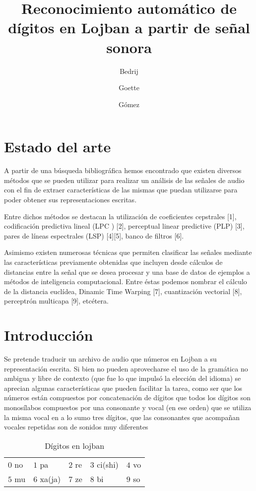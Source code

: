 \documentclass[a4paper]{article}
\title{Reconocimiento automático de dígitos en Lojban a partir de señal sonora}
\author{Bedrij \and Goette \and Gómez}
\date{}
\begin{document}
	\maketitle
	\section{Estado del arte}
		A partir de una búsqueda bibliográfica hemos encontrado que existen
		diversos métodos que se pueden utilizar para realizar un análisis de
		las señales de audio con el fin de extraer características de las mismas
		que puedan utilizarse para poder obtener sus representaciones escritas.

		Entre dichos métodos se destacan la utilización de coeficientes
		cepstrales [1], codificación predictiva lineal (LPC ) [2], perceptual
		linear predictive (PLP) [3], pares de líneas espectrales (LSP) [4][5],
		banco de filtros [6].


		Asimismo existen numerosas técnicas que permiten clasificar las señales
		mediante las características previamente obtenidas que incluyen desde
		cálculos de distancias entre la señal que se desea procesar y una base
		de datos de ejemplos a métodos de inteligencia computacional. Entre
		éstas podemos nombrar el cálculo de la distancia euclídea, Dinamic
		Time Warping [7],  cuantización vectorial [8], perceptrón multicapa
		[9], etcétera.

	\section{Introducción}
		Se pretende traducir un archivo de audio que números en Lojban
		a su representación escrita.
		Si bien no pueden aprovecharse el uso de la gramática
		no ambigua y libre de contexto (que fue lo que impulsó la
		elección del idioma) se aprecian algunas características que
		pueden facilitar la tarea, como ser que los números están
		compuestos por concatenación de dígitos que todos los dígitos
		son monosílabos compuestos por una consonante y vocal (en ese
		orden) que se utiliza la misma vocal en a lo sumo tres dígitos,
		que las consonantes que acompañan vocales repetidas son de
		sonidos muy diferentes

		\begin{table}[h]
			\center
			\begin{tabular}{lllll}
				$0$ no & $1$ pa & $2$ re & $3$ ci(shi) & $4$ vo\\
				$5$ mu & $6$ xa(ja) & $7$ ze & $8$ bi & $9$ so\\
			\end{tabular}
			\caption{Dígitos en lojban}
		\end{table}
\end{document}
